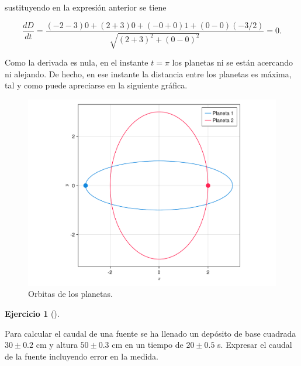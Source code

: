 \documentclass[
  a4paper,
]{scrreport}
\theoremstyle{definition}
\newtheorem{exercise}{Ejercicio}[chapter]
\theoremstyle{remark}
\begin{document}
\begin{tcolorbox}
sustituyendo en la expresión anterior se tiene

\[
\frac{dD}{dt} 
= \frac{(-2-3)0 + (2+3)0 + (-0+0)1 + (0-0)(-3/2)}{\sqrt{(2+3)^2 + (0-0)^2}}
= 0.
\]

Como la derivada es nula, en el instante \(t=\pi\) los planetas ni se
están acercando ni alejando. De hecho, en ese instante la distancia
entre los planetas es máxima, tal y como puede apreciarse en la
siguiente gráfica.

\begin{figure}[H]

{\centering \includegraphics{img/derivadas-funciones-varias-variables/planetas.pdf}

}

\caption{Orbitas de los planetas.}

\end{figure}

\end{tcolorbox}

\begin{exercise}[]\protect\hypertarget{exr-transmision-errores-caudal-fuente}{}\label{exr-transmision-errores-caudal-fuente}

Para calcular el caudal de una fuente se ha llenado un depósito de base
cuadrada \(30\pm 0.2\) cm y altura \(50\pm 0.3\) cm en un tiempo de
\(20\pm 0.5\) s. Expresar el caudal de la fuente incluyendo error en la
medida.

\end{exercise}
\end{document}

